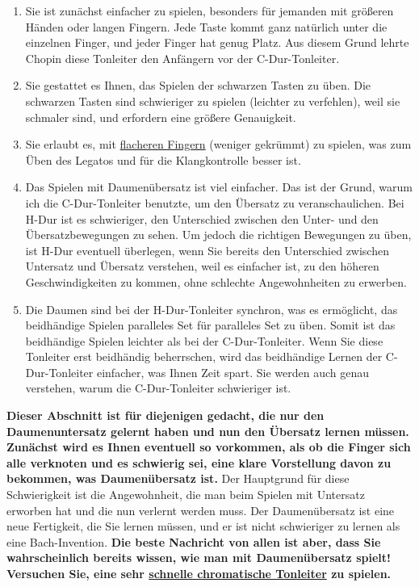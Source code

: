 \begin{enumerate}[label={\arabic*.}] 
\item Sie ist zunächst einfacher zu spielen, besonders für jemanden mit größeren Händen oder langen Fingern.
Jede Taste kommt ganz natürlich unter die einzelnen Finger, und jeder Finger hat genug Platz.
Aus diesem Grund lehrte Chopin diese Tonleiter den Anfängern vor der C-Dur-Tonleiter.
\item Sie gestattet es Ihnen, das Spielen der schwarzen Tasten zu üben.
Die schwarzen Tasten sind schwieriger zu spielen (leichter zu verfehlen), weil sie schmaler sind, und erfordern eine größere Genauigkeit.
\item Sie erlaubt es, mit \hyperref[c1iii4b]{flacheren Fingern} (weniger gekrümmt) zu spielen, was zum Üben des Legatos und für die Klangkontrolle besser ist.
\item Das Spielen mit Daumenübersatz ist viel einfacher.
Das ist der Grund, warum ich die C-Dur-Tonleiter benutzte, um den Übersatz zu veranschaulichen.
Bei H-Dur ist es schwieriger, den Unterschied zwischen den Unter- und den Übersatzbewegungen zu sehen.
Um jedoch die richtigen Bewegungen zu üben, ist H-Dur eventuell überlegen, wenn Sie bereits den Unterschied zwischen Untersatz und Übersatz verstehen, weil es einfacher ist, zu den höheren Geschwindigkeiten zu kommen, ohne schlechte Angewohnheiten zu erwerben.
\item Die Daumen sind bei der H-Dur-Tonleiter synchron, was es ermöglicht, das beidhändige Spielen paralleles Set für paralleles Set zu üben.
Somit ist das beidhändige Spielen leichter als bei der C-Dur-Tonleiter.
Wenn Sie diese Tonleiter erst beidhändig beherrschen, wird das beidhändige Lernen der C-Dur-Tonleiter einfacher, was Ihnen Zeit spart.
Sie werden auch genau verstehen, warum die C-Dur-Tonleiter schwieriger ist.

 \end{enumerate}
\textbf{Dieser Abschnitt ist für diejenigen gedacht, die nur den Daumenuntersatz gelernt haben und nun den Übersatz lernen müssen.
Zunächst wird es Ihnen eventuell so vorkommen, als ob die Finger sich alle verknoten und es schwierig sei, eine klare Vorstellung davon zu bekommen, was Daumenübersatz ist.}
Der Hauptgrund für diese Schwierigkeit ist die Angewohnheit, die man beim Spielen mit Untersatz erworben hat und die nun verlernt werden muss.
Der Daumenübersatz ist eine neue Fertigkeit, die Sie lernen müssen, und er ist nicht schwieriger zu lernen als eine Bach-Invention.
\textbf{Die beste Nachricht von allen ist aber, dass Sie wahrscheinlich bereits wissen, wie man mit Daumenübersatz spielt!
Versuchen Sie, eine sehr \hyperref[c1iii5h]{schnelle chromatische Tonleiter} zu spielen.}
